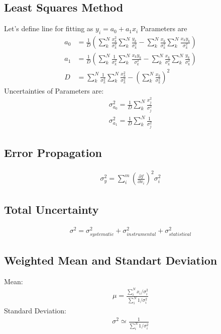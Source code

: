 \documentclass[reprint,amsmath,aps,nofootinbib,english]{revtex4-2}
\begin{document}
\subsection{Least Squares Method}

Let's define line for fitting as $y_i = a_0 + a_1x_i$
Parameters are
\begin{align}
  a_0 &= \frac{1}{D}\left(\sum_{k}^{N}\frac{x^2_k}{\sigma^2_k} \sum_{k}^{N}\frac{y_k}{\sigma^2_k} - \sum_{k}^{N}\frac{x_k}{\sigma^2_k} \sum_{k}^{N}\frac{x_k y_k}{\sigma^2_k}\right) \\
    a_1 &= \frac{1}{D}\left(\sum_{k}^{N}\frac{1}{\sigma^2_k} \sum_{k}^{N}\frac{x_k y_k}{\sigma^2_k} - \sum_{k}^{N}\frac{x_k}{\sigma^2_k} \sum_{k}^{N}\frac{y_k}{\sigma^2_k}\right) \\
    D &= \sum_{k}^{N}\frac{1}{\sigma^2_k} \sum_{k}^{N}\frac{x^2_k}{\sigma^2_k} - \left(\sum_{k}^{N}\frac{x_k}{\sigma^2_k}\right)^2
\end{align}
Uncertainties of Parameters are:
\begin{align}
\sigma^2_{a_0} = \frac{1}{D} \sum_{k}^{N}\frac{x^2_j}{\sigma^2_j} \\
\sigma^2_{a_1} = \frac{1}{D} \sum_{k}^{N}\frac{1}{\sigma^2_j}
\end{align}

\subsection{Error Propagation}
\begin{align}
  \sigma^2_y = \sum_i^m \left(\frac{\partial f}{\partial x_i}\right)^2 \sigma^2_i \label{eq:err}
\end{align}

\subsection{Total Uncertainty}
\begin{align}
  \sigma^2 = \sigma_{systematic}^2 + \sigma_{instrumental}^2 + \sigma_{statistical}^2 \label{eq:unc}
\end{align}

\subsection{Weighted Mean and Standart Deviation} 
Mean:
\begin{align}
\mu = \frac{\sum\limits_i^N x_i / \sigma_i^2}{\sum\limits_i^N 1/\sigma_i^2} \label{eq:mean}
\end{align}
Standard Deviation:
\begin{align}
  \sigma^2 \simeq \frac{1}{\sum\limits_i^N 1/\sigma_i^2}  \label{eq:meanstd}
\end{align}


\newpage
\nocite{*}

\end{document}
